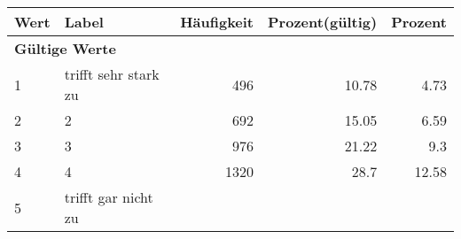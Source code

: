      \begin{longtable}{lXrrr}
     \toprule
     \textbf{Wert} & \textbf{Label} & \textbf{Häufigkeit} & \textbf{Prozent(gültig)} & \textbf{Prozent} \\
     \endhead
     \midrule
     \multicolumn{5}{l}{\textbf{Gültige Werte}}\\

     1 &
     \multicolumn{1}{X}{ trifft sehr stark zu   } &


       \num{496} &
       \num[round-mode=places,round-precision=2]{10,78} &
         \num[round-mode=places,round-precision=2]{4,73} \\

     2 &
     \multicolumn{1}{X}{ 2   } &


       \num{692} &
       \num[round-mode=places,round-precision=2]{15,05} &
         \num[round-mode=places,round-precision=2]{6,59} \\

     3 &
     \multicolumn{1}{X}{ 3   } &


       \num{976} &
       \num[round-mode=places,round-precision=2]{21,22} &
         \num[round-mode=places,round-precision=2]{9,3} \\

     4 &
     \multicolumn{1}{X}{ 4   } &


       \num{1320} &
       \num[round-mode=places,round-precision=2]{28,7} &
         \num[round-mode=places,round-precision=2]{12,58} \\

     5 &
     \multicolumn{1}{X}{ trifft gar nicht zu   } &



\end{longtable}
